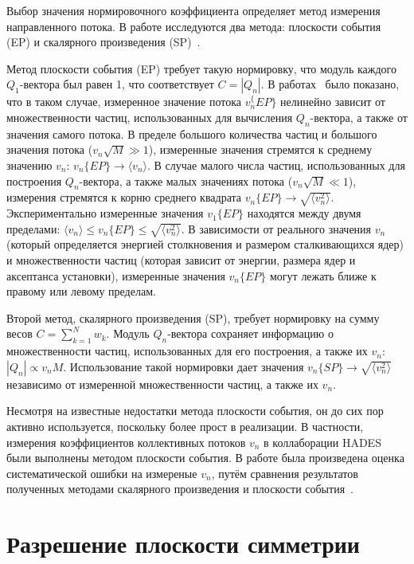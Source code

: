 Выбор значения нормировочного коэффициента определяет метод измерения направленного потока. 
В работе исследуются два метода: плоскости события (EP) и скалярного произведения (SP)~\cite{Mamaev:2020lpi}. 

Метод плоскости события (EP) требует такую нормировку, что модуль каждого $Q_1$-вектора был равен 1, что соответствует $C=|Q_n|$. 
В работах~\cite{Borghini:2001vi, Bhalerao:2006tp} было показано, что в таком случае, измеренное значение потока $v_n^\{EP\}$ нелинейно зависит от множественности частиц, использованных для вычисления $Q_n$-вектора, а также от значения самого потока. 
В пределе большого количества частиц и большого значения потока ($v_n \sqrt{M} \gg 1$), измеренные значения стремятся к среднему значению $v_n$: $v_n\{EP\} \xrightarrow{} \langle v_n \rangle$. 
В случае малого числа частиц, использованных для построения $Q_n$-вектора, а также малых значениях потока ($v_n \sqrt{M} \ll 1$), измерения стремятся к корню среднего квадрата $ v_n\{EP\} \xrightarrow{} \sqrt{ \langle v_n^2 \rangle }$.
Экспериментально измеренные значения $v_1\{EP\}$ находятся между двумя пределами: $ \langle v_n \rangle \leq v_n\{EP\} \leq \sqrt{ \langle v_n^2 \rangle } $.
В зависимости от реального значения $v_n$ (который определяется энергией столкновения и размером сталкивающихся ядер) и множественности частиц (которая зависит от энергии, размера ядер и аксептанса установки), измеренные значения $v_n\{EP\}$ могут лежать ближе к правому или левому пределам.

Второй метод, скалярного произведения (SP), требует нормировку на сумму весов $C=\sum_{k=1}^N w_k$.
Модуль $Q_n$-вектора сохраняет информацию о множественности частиц, использованных для его построения, а также их $v_n$: $|Q_n| \propto v_n M$.
Использование такой нормировки дает значения $v_n\{SP\} \xrightarrow{} \sqrt{\langle v_n^2 \rangle}$ независимо от измеренной множественности частиц, а также их $v_n$.

Несмотря на известные недостатки метода плоскости события, он до сих пор активно используется, поскольку более прост в реализации. 
В частности, измерения коэффициентов коллективных потоков $v_n$ в коллаборации HADES~\cite{HADES:2020lob} были выполнены методом плоскости события. 
В работе была произведена оценка систематической ошибки на измереные $v_n$, путём сравнения результатов полученных методами скалярного произведения и плоскости события~\cite{Mamaev:2020lpi}.

\section{Разрешение плоскости симметрии}


